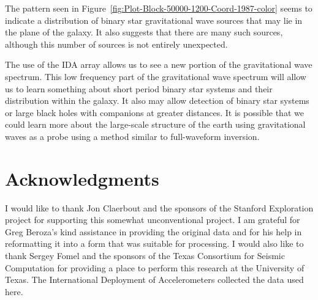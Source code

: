 The pattern seen in Figure~\ref{fig:Plot-Block-50000-1200-Coord-1987-color} seems to indicate a distribution of binary star gravitational wave sources that may lie in the plane of the galaxy.  It also suggests that there are many such sources, although this number of sources is not entirely unexpected. 

The use of the IDA array allows us to see a new portion of the gravitational wave spectrum.  This low frequency part of the gravitational wave spectrum will allow us to learn something about short period binary star systems and their distribution within the galaxy.  It also may allow detection of binary star systems or large black holes with companions at  greater distances.  
It is possible that we could learn more about the large-scale structure of the earth using gravitational waves as a probe using a method similar to full-waveform inversion.  


\section{Acknowledgments}

I would like to thank Jon Claerbout and the sponsors of the Stanford Exploration project for supporting this somewhat unconventional project.  I am grateful for Greg Beroza's kind assistance in providing the original data and for his help in reformatting it into a form that was suitable for processing.  
I would also like to thank Sergey Fomel and the sponsors of the Texas Consortium for Seismic Computation for providing a place to perform this research at the University of Texas.
The International Deployment of Accelerometers collected the data used here.
 
 






\onecolumn

%


